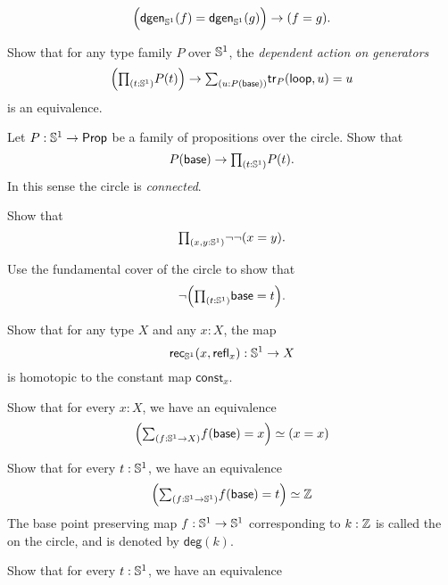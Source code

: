 \begin{exercises}
\begin{subexenum}
\begin{equation*}
\Big(\mathsf{dgen}_{\mathbb{S}^{1}}(f)=\mathsf{dgen}_{\mathbb{S}^{1}}(g)\Big)\to (f=g).
\end{equation*}
\item Show that for any type family $P$ over $\mathbb{S}^{1}$, the \emph{dependent action on generators}
\begin{equation*}
\Big(\prd{t:\sphere{1}}P(t)\Big)\to \sm{u:P(\base)}\mathsf{tr}_P(\lloop,u)=u
\end{equation*}
is an equivalence.
\end{subexenum}
\item Let $P:\mathbb{S}^{1}\to\mathsf{Prop}$ be a family of propositions over the circle. Show that
\begin{equation*}
P(\base)\to\prd{t:\sphere{1}}P(t).
\end{equation*}
In this sense the circle is \emph{connected}.
\item Show that
\begin{equation*}
\prd{x,y:\sphere{1}}\neg\neg(x=y).
\end{equation*}
\item Use the fundamental cover of the circle to show that
\begin{equation*}
\neg\Big(\prd{t:\sphere{1}}\base=t\Big).
\end{equation*}
\item \label{ex:circle_constant}
Show that for any type $X$ and any $x:X$, the map
\begin{equation*}
\mathsf{rec}_{\mathbb{S}^{1}}(x,\mathsf{refl}_{x}):\mathbb{S}^{1}\to X
\end{equation*}
is homotopic to the constant map $\mathsf{const}_x$.
\item \label{ex:circle_degk}
\begin{subexenum}
\item Show that for every $x:X$, we have an equivalence
\begin{equation*}
\eqv{\Big(\sm{f:\sphere{1}\to X}f(\base)= x \Big)}{(x=x)}
\end{equation*}
\item Show that for every $t:\mathbb{S}^{1}$, we have an equivalence
\begin{equation*}
\eqv{\Big(\sm{f:\sphere{1}\to \sphere{1}}f(\base)= t \Big)}{\Z}
\end{equation*}
The base point preserving map $f:\mathbb{S}^{1}\to\mathbb{S}^{1}$ corresponding to $k:\mathbb{Z}$ is called the  on the circle, and is denoted by $\mathsf{deg}(k)$.
\item Show that for every $t:\mathbb{S}^{1}$, we have an equivalence

\end{subexenum}
\end{exercises}
